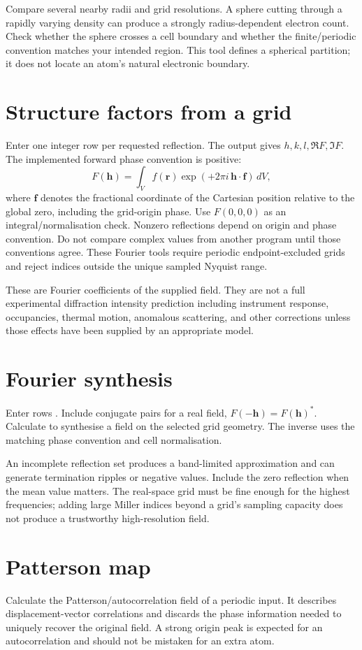 Compare several nearby radii and grid resolutions. A sphere cutting through a rapidly varying density can produce a strongly radius-dependent electron count. Check whether the sphere crosses a cell boundary and whether the finite/periodic convention matches your intended region. This tool defines a spherical partition; it does not locate an atom's natural electronic boundary.

\section{Structure factors from a grid}
Enter one integer  row per requested reflection. The output gives $h,k,l,\Re F,\Im F$. The implemented forward phase convention is positive:
\[
F(\mathbf h)=\int_V f(\mathbf r)\exp(+2\pi i\,\mathbf h\cdot\mathbf f)\,dV,
\]
where $\mathbf f$ denotes the fractional coordinate of the Cartesian position relative to the global zero, including the grid-origin phase. Use $F(0,0,0)$ as an integral/normalisation check. Nonzero reflections depend on origin and phase convention. Do not compare complex values from another program until those conventions agree. These Fourier tools require periodic endpoint-excluded grids and reject indices outside the unique sampled Nyquist range.

These are Fourier coefficients of the supplied field. They are not a full experimental diffraction intensity prediction including instrument response, occupancies, thermal motion, anomalous scattering, and other corrections unless those effects have been supplied by an appropriate model.

\section{Fourier synthesis}
Enter rows . Include conjugate pairs for a real field, $F(-\mathbf h)=F(\mathbf h)^*$. Calculate to synthesise a field on the selected grid geometry. The inverse uses the matching phase convention and cell normalisation.

An incomplete reflection set produces a band-limited approximation and can generate termination ripples or negative values. Include the zero reflection when the mean value matters. The real-space grid must be fine enough for the highest frequencies; adding large Miller indices beyond a grid's sampling capacity does not produce a trustworthy high-resolution field.

\section{Patterson map}
Calculate the Patterson/autocorrelation field of a periodic input. It describes displacement-vector correlations and discards the phase information needed to uniquely recover the original field. A strong origin peak is expected for an autocorrelation and should not be mistaken for an extra atom.

